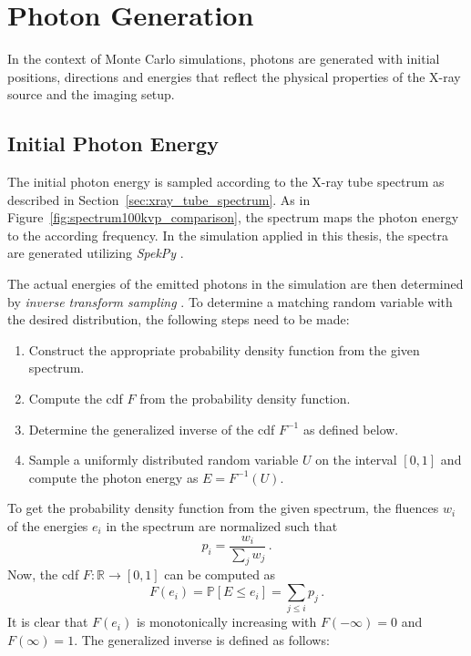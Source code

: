 \section{Photon Generation}

In the context of Monte Carlo simulations, photons are generated with initial
positions, directions and energies that reflect the physical properties of the
X-ray source and the imaging setup.

\subsection{Initial Photon Energy}
\label{sec:photon_energy}
The initial photon energy is sampled according to the X-ray tube spectrum as
described in Section~\ref{sec:xray_tube_spectrum}. As in
Figure~\ref{fig:spectrum100kvp_comparison}, the spectrum maps the photon energy
to the according frequency. In the simulation applied in this thesis, the
spectra are generated utilizing \emph{SpekPy}
\cite{spekpy,poludniowski2021spekpy}.

The actual energies of the emitted photons in the simulation are then determined
by \emph{inverse transform sampling} \cite[Chapter~4]{muller2012monte}. To
determine a matching random variable with the desired distribution, the
following steps need to be made:

\begin{enumerate}[label=(\roman*)]
    \item Construct the appropriate probability density function from the given
    spectrum.
    \item Compute the \ac{cdf} $F$ from the probability density function.
    \item Determine the generalized inverse of the \ac{cdf} $F^{-1}$ as defined
    below.
    \item Sample a uniformly distributed random variable $U$ on the interval
    $[0,1]$ and compute the photon energy as $E = F^{-1}(U)$.
\end{enumerate}

To get the probability density function from the given spectrum, the fluences
$w_i$ of the energies $e_i$ in the spectrum are normalized such that
\begin{equation*}
    p_i = \frac{w_i}{\sum_j w_j}\,.
\end{equation*}
Now, the \ac{cdf} $F:\mathbb{R}\to[0,1]$ can be computed as
\begin{equation*}
    F(e_i) = \mathbb{P}[E \leq e_i] = \sum_{j \leq i} p_j\,.
\end{equation*}
It is clear that $F(e_i)$ is monotonically increasing with $F(-\infty) = 0$ and
$F(\infty) = 1$. The generalized inverse is defined as follows:

